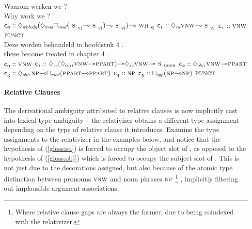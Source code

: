 \begin{exe}
\label{gloss:whq}
\glll Waarom werken we ? \\
Why work we ? \\
	$\con{0}::\ddia{whbody}(\ddia{mod}\dbox{mod}(\svi[s]\li\svi[s])\li\svi[s])\li\whq[s]$
	$\con{1}::\ddia{su}\vnw[s]\li\svi[s]$
	$\con{1}::\vnw[s]$
	$\punct[s]$\\
	
\label{gloss:passive}
\glll Deze worden behandeld in hoofdstuk 4 .\\
these become treated in chapter 4 .\\
	$\con{0}::\vnw[s]$
	$\con{1}::\ddia{vc}(\ddia{obj1}\vnw[s]\li\ppart[s])\li\ddia{su}\vnw[s]\li\smain[s]$
	$\con{2}::\ddia{obj1}\vnw[s]\li\ppart[s]$
	$\con{3}::\ddia{obj1}\np[s]\li\dbox{mod}(\ppart[s]\li\ppart[s])$
	$\con{4}::\np[s]$
	$\con{5}::\dbox{app}(\np[s]\li\np[s])$
	$\punct[s]$\\
\end{exe}


\paragraph{Relative Clauses}
The derivational ambiguity attributed to relative clauses is now implicitly cast into lexical type ambiguity -- the relativizer obtains a different type assignment depending on the type of relative clause it introduces.
Examine the type assignments to the relativizer  in the examples below, and notice that the hypothesis of (\ref{gloss:su}) is forced to occupy the object slot of , as opposed to the hypothesis of (\ref{gloss:obj}) which is forced to occupy the subject slot of .
This is not just due to the decorations assigned, but also because of the atomic type distinction between pronouns $\vnw[s]$ and noun phrases $\np[s]$%
	\footnote{Where relative clause gaps are always the former, due to being coindexed with the relativizer.}%
, implicitly filtering out implausible argument associations.

